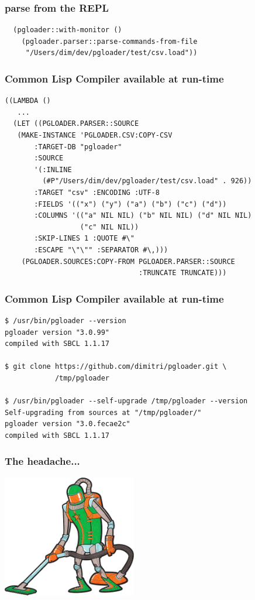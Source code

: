 \documentclass{beamer}
\begin{document}
\begin{frame}[fragile]
  \frametitle{parse from the REPL}

\begin{verbatim}
  (pgloader::with-monitor ()
    (pgloader.parser::parse-commands-from-file
     "/Users/dim/dev/pgloader/test/csv.load"))
\end{verbatim}
\end{frame}

\begin{frame}[fragile]
  \frametitle{Common Lisp Compiler available at run-time}

\begin{verbatim}
((LAMBDA ()
   ...
  (LET ((PGLOADER.PARSER::SOURCE
   (MAKE-INSTANCE 'PGLOADER.CSV:COPY-CSV
       :TARGET-DB "pgloader"
       :SOURCE
       '(:INLINE
         (#P"/Users/dim/dev/pgloader/test/csv.load" . 926))
       :TARGET "csv" :ENCODING :UTF-8
       :FIELDS '(("x") ("y") ("a") ("b") ("c") ("d"))
       :COLUMNS '(("a" NIL NIL) ("b" NIL NIL) ("d" NIL NIL)
                  ("c" NIL NIL))
       :SKIP-LINES 1 :QUOTE #\"
       :ESCAPE "\"\"" :SEPARATOR #\,)))
    (PGLOADER.SOURCES:COPY-FROM PGLOADER.PARSER::SOURCE
                                :TRUNCATE TRUNCATE)))
\end{verbatim}
\end{frame}

\begin{frame}[fragile]
  \frametitle{Common Lisp Compiler available at run-time}

\begin{verbatim}
$ /usr/bin/pgloader --version
pgloader version "3.0.99"
compiled with SBCL 1.1.17

$ git clone https://github.com/dimitri/pgloader.git \
            /tmp/pgloader

$ /usr/bin/pgloader --self-upgrade /tmp/pgloader --version
Self-upgrading from sources at "/tmp/pgloader/"
pgloader version "3.0.fecae2c"
compiled with SBCL 1.1.17
\end{verbatim}
\end{frame}

\begin{frame}
  \frametitle{The headache...}

  \begin{center}
    \includegraphics[height=2.1in]{robot-cleaner.jpg}
  \end{center}
\end{frame}
\end{document}
